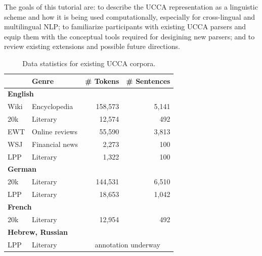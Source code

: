 \documentclass[11pt,a4paper,table]{article}
\begin{document}
The goals of this tutorial are:
to describe the UCCA representation as a linguistic scheme and how it is
being used computationally, especially for cross-lingual and multilingual
NLP; to familiarize participants with existing UCCA parsers and
equip them with the conceptual tools required for desigining new parsers;
and to review existing extensions and possible future directions.

\begin{table}[t]
\centering\setlength{\tabcolsep}{3.5pt}
\begin{tabular}{ll|rr}
& \bf Genre & \bf \# Tokens & \bf \# Sentences \\
\hline
\multicolumn{2}{l|}{\bf English} \\
Wiki & Encyclopedia & 158,573 & 5,141 \\
20k & Literary & 12,574 & 492 \\
EWT & Online reviews & 55,590 & 3,813 \\
WSJ & Financial news & 2,273 & 100 \\
LPP & Literary & 1,322 & 100 \\\hline
\multicolumn{2}{l|}{\bf German} \\
20k & Literary & 144,531 & 6,510 \\
LPP & Literary & 18,653 & 1,042 \\\hline
\multicolumn{2}{l|}{\bf French} \\
20k & Literary & 12,954 & 492 \\\hline
\multicolumn{2}{l|}{\bf Hebrew, Russian} \\
LPP & Literary & \multicolumn{2}{c}{annotation underway}\\\hline
\end{tabular}
\caption{Data statistics for existing UCCA corpora.\label{tab:data}}
\end{table}
\end{document}
